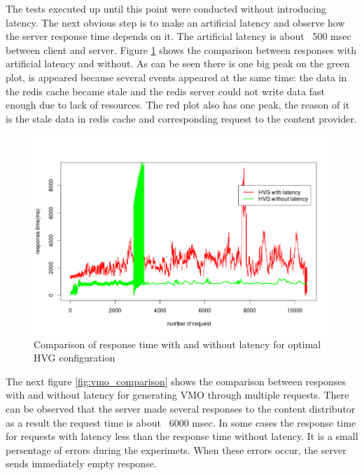 The tests executed up until this point were conducted without introducing latency. The next obvious step is to make an artificial latency and observe how the server response time depends on it. The artificial latency is about ~500 msec between client and server. Figure \ref{fig:hvg_comparison} shows the comparison between responses with artificial latency and without. As can be seen there is one big peak on the green plot, is appeared because several events appeared at the same time: the data in the redis cache became stale and the redis server could not write data fast enough due to lack of resources. The red plot also has one peak, the reason of it is the stale data in redis cache and corresponding request to the content provider.


\begin{figure}[h]
    \centering
    \includegraphics[width=\textwidth]{images/hvg_latency_comparison.png}
    \caption{Comparison of response time with and without latency for optimal HVG configuration}
    \label{fig:hvg_comparison}
\end{figure}

The next figure \ref{fig:vmo_comparison} shows the comparison between responses with and without latency for generating VMO through multiple requests. There can be observed that the server made several responses to the content distributor as a result the request time is about ~6000 msec. In some cases the response time for requests with latency less than the response time without latency. It is a small persentage of errors during the experimets. When these errors occur, the server sends immediately empty response.


